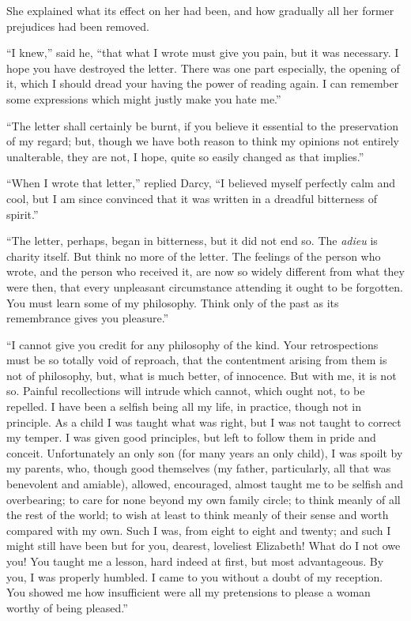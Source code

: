 \documentclass[12pt,english,oneside]{book}
\begin{document}
She explained what its effect on her had been, and how gradually all
her former prejudices had been removed.

{}``I knew,'' said he, {}``that what I wrote must give you pain,
but it was necessary. I hope you have destroyed the letter. There
was one part especially, the opening of it, which I should dread your
having the power of reading again. I can remember some expressions
which might justly make you hate me.''

{}``The letter shall certainly be burnt, if you believe it essential
to the preservation of my regard; but, though we have both reason
to think my opinions not entirely unalterable, they are not, I hope,
quite so easily changed as that implies.''

{}``When I wrote that letter,'' replied Darcy, {}``I believed myself
perfectly calm and cool, but I am since convinced that it was written
in a dreadful bitterness of spirit.''

{}``The letter, perhaps, began in bitterness, but it did not end
so. The \emph{adieu} is charity itself. But think no more of the letter.
The feelings of the person who wrote, and the person who received
it, are now so widely different from what they were then, that every
unpleasant circumstance attending it ought to be forgotten. You must
learn some of my philosophy. Think only of the past as its remembrance
gives you pleasure.''

{}``I cannot give you credit for any philosophy of the kind. Your
retrospections must be so totally void of reproach, that the contentment
arising from them is not of philosophy, but, what is much better,
of innocence. But with me, it is not so. Painful recollections will
intrude which cannot, which ought not, to be repelled. I have been
a selfish being all my life, in practice, though not in principle.
As a child I was taught what was right, but I was not taught to correct
my temper. I was given good principles, but left to follow them in
pride and conceit. Unfortunately an only son (for many years an only
child), I was spoilt by my parents, who, though good themselves (my
father, particularly, all that was benevolent and amiable), allowed,
encouraged, almost taught me to be selfish and overbearing; to care
for none beyond my own family circle; to think meanly of all the rest
of the world; to wish at least to think meanly of their sense and
worth compared with my own. Such I was, from eight to eight and twenty;
and such I might still have been but for you, dearest, loveliest Elizabeth!
What do I not owe you! You taught me a lesson, hard indeed at first,
but most advantageous. By you, I was properly humbled. I came to you
without a doubt of my reception. You showed me how insufficient were
all my pretensions to please a woman worthy of being pleased.''
\end{document}

